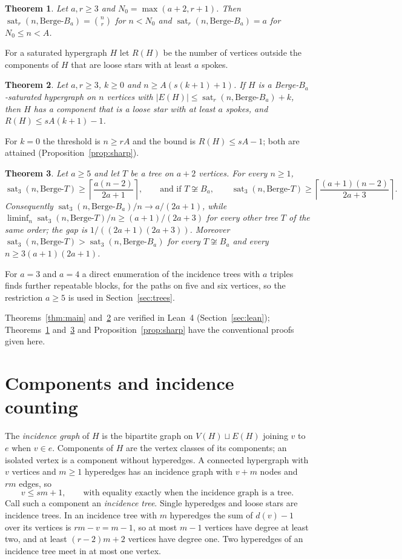 \documentclass[11pt]{article}
\newtheorem{theorem}{Theorem}
\theoremstyle{definition}
\theoremstyle{remark}
\newcommand{\sat}{\operatorname{sat}}
\newcommand{\BB}{\text{Berge-}B_a}
\begin{document}
\begin{theorem}\label{thm:small}
Let $a,r\ge3$ and $N_0=\max(a+2,r+1)$. Then $\sat_r(n,\BB)=\binom nr$ for
$n<N_0$ and $\sat_r(n,\BB)=a$ for $N_0\le n<A$.
\end{theorem}

For a saturated hypergraph $H$ let $R(H)$ be the number of vertices outside
the components of $H$ that are loose stars with at least $a$ spokes.

\begin{theorem}\label{thm:stability}
Let $a,r\ge3$, $k\ge0$ and $n\ge A(s(k+1)+1)$. If $H$ is a
Berge-$B_a$-saturated hypergraph on $n$ vertices with
$|E(H)|\le\sat_r(n,\BB)+k$, then $H$ has a component that is a loose star
with at least $a$ spokes, and $R(H)\le sA(k+1)-1$.
\end{theorem}

For $k=0$ the threshold is $n\ge rA$ and the bound is $R(H)\le sA-1$; both
are attained (Proposition~\ref{prop:sharp}).

\begin{theorem}\label{thm:trees}
Let $a\ge5$ and let $T$ be a tree on $a+2$ vertices. For every $n\ge1$,
\[
\sat_3(n,\text{Berge-}T)\ge\left\lceil\frac{a(n-2)}{2a+1}\right\rceil ,
\qquad\text{and if }T\not\cong B_a,\qquad
\sat_3(n,\text{Berge-}T)\ge\left\lceil\frac{(a+1)(n-2)}{2a+3}\right\rceil .
\]
Consequently $\sat_3(n,\BB)/n\to a/(2a+1)$, while
$\liminf_n\sat_3(n,\text{Berge-}T)/n\ge(a+1)/(2a+3)$ for every other tree
$T$ of the same order; the gap is $1/((2a+1)(2a+3))$. Moreover
$\sat_3(n,\text{Berge-}T)>\sat_3(n,\BB)$ for every $T\not\cong B_a$ and
every $n\ge3(a+1)(2a+1)$.
\end{theorem}

For $a=3$ and $a=4$ a direct enumeration of the incidence trees with $a$
triples finds further repeatable blocks, for the paths on five and six
vertices, so the restriction $a\ge5$ is used in Section~\ref{sec:trees}.

Theorems~\ref{thm:main} and~\ref{thm:stability} are verified in Lean~4
(Section~\ref{sec:lean}); Theorems~\ref{thm:small} and~\ref{thm:trees} and
Proposition~\ref{prop:sharp} have the conventional proofs given here.

\section{Components and incidence counting}

The \emph{incidence graph} of $H$ is the bipartite graph on
$V(H)\sqcup E(H)$ joining $v$ to $e$ when $v\in e$. Components of $H$ are
the vertex classes of its components; an isolated vertex is a component
without hyperedges. A connected hypergraph with $v$ vertices and $m\ge1$
hyperedges has an incidence graph with $v+m$ nodes and $rm$ edges, so
\[
v\le sm+1,\qquad\text{with equality exactly when the incidence graph is a
tree.}
\]
Call such a component an \emph{incidence tree}. Single hyperedges and loose
stars are incidence trees. In an incidence tree with $m$ hyperedges the sum
of $d(v)-1$ over its vertices is $rm-v=m-1$, so at most $m-1$ vertices have
degree at least two, and at least $(r-2)m+2$ vertices have degree one. Two
hyperedges of an incidence tree meet in at most one vertex.
\end{document}
